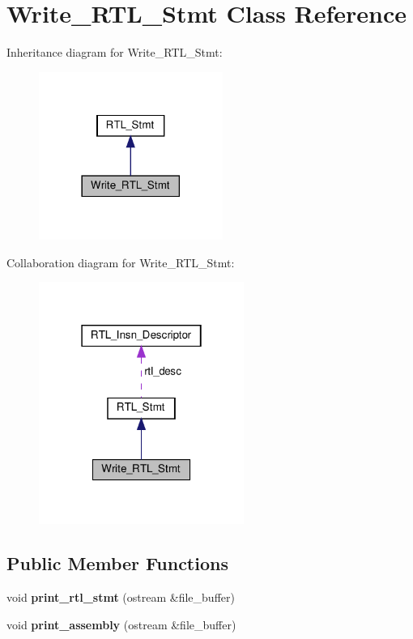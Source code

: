\hypertarget{classWrite__RTL__Stmt}{}\section{Write\+\_\+\+R\+T\+L\+\_\+\+Stmt Class Reference}
\label{classWrite__RTL__Stmt}


Inheritance diagram for Write\+\_\+\+R\+T\+L\+\_\+\+Stmt\+:
\nopagebreak
\begin{figure}[H]
\begin{center}
\leavevmode
\includegraphics[width=170pt]{classWrite__RTL__Stmt__inherit__graph}
\end{center}
\end{figure}


Collaboration diagram for Write\+\_\+\+R\+T\+L\+\_\+\+Stmt\+:
\nopagebreak
\begin{figure}[H]
\begin{center}
\leavevmode
\includegraphics[width=190pt]{classWrite__RTL__Stmt__coll__graph}
\end{center}
\end{figure}
\subsection*{Public Member Functions}
\begin{DoxyCompactItemize}
\item 
\mbox{\label{classWrite__RTL__Stmt_a41f66a927d7c7bfda2ecada31ef9a3b6}} 
void {\bfseries print\+\_\+rtl\+\_\+stmt} (ostream \&file\+\_\+buffer)
\item 
\mbox{\label{classWrite__RTL__Stmt_a658d293fe4964ab9133c29c97b211b5d}} 
void {\bfseries print\+\_\+assembly} (ostream \&file\+\_\+buffer)
\end{DoxyCompactItemize}
